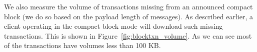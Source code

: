  We also measure the volume of transactions missing from an announced compact block (we do so based on the payload length of  messages).
As described earlier,  a \bc client operating in the compact block mode will download such missing transactions.
This is shown in Figure~\ref{fig:blocktxn_volume}. 
As we can see most of the transactions have volumes less than 100 KB. 

